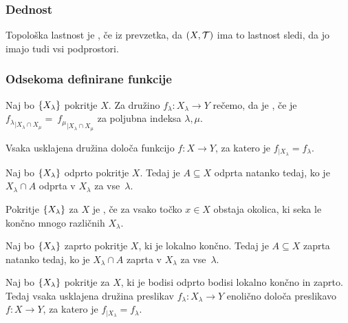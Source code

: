 \subsubsection{Dednost}
\begin{definicija}
    Topološka lastnost je , če iz prevzetka, da $(X, \mathcal{T})$ ima to lastnost sledi, da jo imajo tudi vsi podprostori.
\end{definicija}

\subsubsection{Odsekoma definirane funkcije}

\begin{definicija}
    Naj bo $\left\{X_\lambda\right\}$ pokritje $X$. Za družino $f_\lambda: X_\lambda \to Y$ rečemo, da je , če je ${f_\lambda}_{|X_\lambda \cap X_\mu} =~{f_\mu}_{|X_\lambda \cap X_\mu}$ za poljubna indeksa $\lambda, \mu$.
\end{definicija}

\begin{trditev}
    Vsaka usklajena družina določa funkcijo $f: X \to Y$, za katero je $f_{|X_\lambda} = f_\lambda$.
\end{trditev}

\begin{lema}
    Naj bo $\left\{X_\lambda\right\}$ odprto pokritje $X$. Tedaj je $A \subseteq X$ odprta natanko tedaj, ko je $X_\lambda \cap A$ odprta v $X_\lambda$ za vse~$\lambda$.
\end{lema}

\begin{definicija}
    Pokritje $\left\{X_\lambda\right\}$ za $X$ je , če za vsako točko $x \in X$ obstaja okolica, ki seka le končno mnogo različnih $X_\lambda$.
\end{definicija}

\begin{lema}
    Naj bo $\left\{X_\lambda\right\}$ zaprto pokritje $X$, ki je lokalno končno. Tedaj je $A \subseteq X$ zaprta natanko tedaj, ko je $X_\lambda \cap A$ zaprta v $X_\lambda$ za vse~$\lambda$.
\end{lema}

\newpage
\begin{izrek}
    Naj bo $\left\{X_\lambda\right\}$ pokritje za $X$, ki je bodisi odprto bodisi lokalno končno in zaprto. Tedaj vsaka usklajena družina preslikav $f_\lambda: X_\lambda \to Y$ enolično določa preslikavo $f: X \to Y$, za katero je $f_{|X_\lambda} = f_\lambda$.
\end{izrek}

